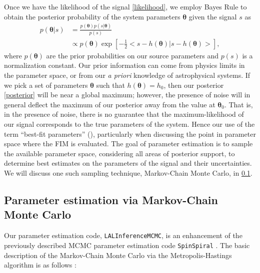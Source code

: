 \documentclass{emulateapj}
\begin{document}
Once we have the likelihood of the signal \eqref{likelihood}, we
employ Bayes Rule to obtain the posterior probability of the system
parameters $\boldsymbol{\theta}$ given the signal $s$ as
\begin{align}
  p(\boldsymbol{\theta} | s) &= \frac{p(\boldsymbol{\theta})p(s | \boldsymbol{\theta})}{p(s)} \nonumber\\
  & \propto p(\boldsymbol{\theta}) \exp\left[-\frac{1}{2}\big < s - h(\boldsymbol{\theta}) | s-h(\boldsymbol{\theta}) \big > \right] ,
  \label{posterior}
\end{align}
where $p(\boldsymbol{\theta})$ are the prior probabilities on our
source parameters and $p(s)$ is a normalization constant.  Our prior
information can come from physics limits in the parameter space, or
from our \textit{a priori} knowledge of astrophysical systems. If we
pick a set of parameters $\boldsymbol{\theta}$ such that
$h(\boldsymbol{\theta}) = h_0$, then our posterior \eqref{posterior}
will be near a global maximum; however, the presence of noise will in
general deflect the maximum of our posterior away from the value at
$\boldsymbol{\theta}_0$. That is, in the presence of noise, there is
no guarantee that the maximum-likelihood of our signal corresponds to
the true parameters of the system.  Hence our use of the term
``best-fit parameters'' (\citep{CutlerFlanagan}), particularly when
discussing the point in parameter space where the FIM is evaluated.
The goal of parameter estimation is to sample the available parameter
space, considering all areas of posterior support, to determine best
estimates on the parameters of the signal and their uncertainties.  We
will discuss one such sampling technique, Markov-Chain Monte Carlo, in
\ref{MCMCSection}.

  
\subsection{Parameter estimation via Markov-Chain Monte Carlo}
\label{MCMCSection}
  
Our parameter estimation code, \texttt{LALInferenceMCMC}, is an
enhancement of the previously described MCMC parameter estimation code
\texttt{SpinSpiral} \citep{spinspiral2009, spinspiral2010}.  The basic
description of the Markov-Chain Monte Carlo via the
Metropolis-Hastings algorithm is as follows \citep{Gilks99}:
  
\end{document}
